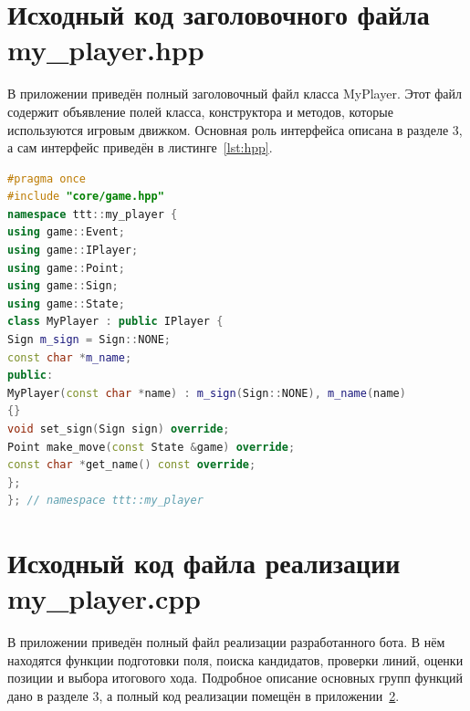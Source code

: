 \documentclass[a4paper,14pt]{extarticle}
\begin{document}
\clearpage
\appendix
\section{Исходный код заголовочного файла my\_player.hpp}
\label{app:hpp}

В приложении приведён полный заголовочный файл класса MyPlayer. Этот файл содержит объявление полей класса, конструктора и методов, которые используются игровым движком. Основная роль интерфейса описана в разделе 3, а сам интерфейс приведён в листинге~\ref{lst:hpp}.

\begin{lstlisting}[language=C++,caption={Файл my\_player.hpp},label={lst:hpp}]
#pragma once
#include "core/game.hpp"
namespace ttt::my_player {
using game::Event;
using game::IPlayer;
using game::Point;
using game::Sign;
using game::State;
class MyPlayer : public IPlayer {
Sign m_sign = Sign::NONE;
const char *m_name;
public:
MyPlayer(const char *name) : m_sign(Sign::NONE), m_name(name)
{}
void set_sign(Sign sign) override;
Point make_move(const State &game) override;
const char *get_name() const override;
};
}; // namespace ttt::my_player

\end{lstlisting}

\clearpage
\section{Исходный код файла реализации my\_player.cpp}
\label{app:cpp}

В приложении приведён полный файл реализации разработанного бота. В нём находятся функции подготовки поля, поиска кандидатов, проверки линий, оценки позиции и выбора итогового хода. Подробное описание основных групп функций дано в разделе 3, а полный код реализации помещён в приложении~\ref{app:cpp}.
\end{document}
